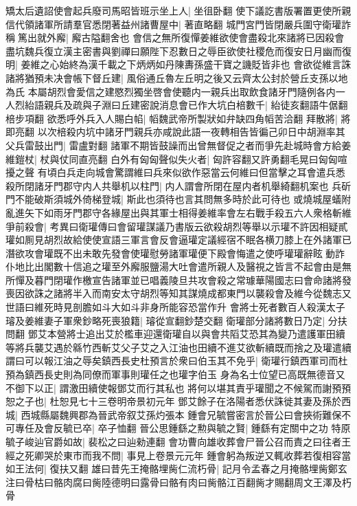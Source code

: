 矯太后遺詔使會起兵廢司馬昭皆班示坐上人|{
	坐徂卧翻}
使下議訖書版署置更使所親信代領諸軍所請羣官悉閉著益州諸曹屋中|{
	著直略翻}
城門宮門皆閉嚴兵圍守衛瓘詐稱篤出就外廨|{
	廨古隘翻舍也}
會信之無所復憚姜維欲使會盡殺北來諸將已因殺會盡坑魏兵復立漢主密書與劉禪曰願陛下忍數日之辱臣欲使社稷危而復安日月幽而復明|{
	姜維之心始終為漢千載之下炳炳如丹陳夀孫盛干寶之譏貶皆非也}
會欲從維言誅諸將猶預未决會帳下督丘建|{
	風俗通丘魯左丘明之後又云齊太公封於營丘支孫以地為氏}
本屬胡烈會愛信之建愍烈獨坐啓會使聽内一親兵出取飲食諸牙門隨例各内一人烈紿語親兵及疏與子淵曰丘建密說消息會已作大坑白棓數千|{
	紿徒亥翻語牛倨翻棓步項翻}
欲悉呼外兵入人賜白㡊|{
	幍魏武帝所製狀如弁缺四角幍苦洽翻}
拜散將|{
	將即亮翻}
以次棓殺内坑中諸牙門親兵亦咸說此語一夜轉相告皆徧己卯日中胡淵率其父兵雷鼓出門|{
	雷盧對翻}
諸軍不期皆鼓譟而出曾無督促之者而爭先赴城時會方給姜維鎧杖|{
	杖與仗同直亮翻}
白外有匈匈聲似失火者|{
	匈許容翻又許勇翻毛晃曰匈匈喧擾之聲}
有頃白兵走向城會驚謂維曰兵來似欲作惡當云何維曰但當擊之耳會遣兵悉殺所閉諸牙門郡守内人共舉机以柱門|{
	内人謂會所閉在屋内者机舉綺翻机案也}
兵斫門不能破斯須城外倚梯登城|{
	斯此也須待也言其問無多時於此可待也}
或燒城屋蟻附亂進矢下如雨牙門郡守各緣屋出與其軍士相得姜維率會左右戰手殺五六人衆格斬維爭前殺會|{
	考異曰衛瓘傳曰會留瓘謀議乃書版云欲殺胡烈等舉以示瓘不許因相疑貳瓘如厠見胡烈故給使使宣語三軍言會反會逼瓘定議經宿不眠各横刀膝上在外諸軍已潛欲攻會瓘既不出未敢先發會使瓘慰勞諸軍瓘便下殿會悔遣之使呼瓘瓘辭眩動詐仆地比出閣數十信追之瓘至外廨服鹽湯大吐會遣所親人及醫視之皆言不起會由是無所憚及暮門閉瓘作檄宣告諸軍並已唱義陵旦共攻會殺之常璩華陽國志曰會命諸將發喪因欲誅之諸將半入而南安太守胡烈等知其謀燒成都東門以襲殺會及維今從魏志又世語曰維死時見剖膽如斗大如斗非身所能容恐當作升}
會將士死者數百人殺漢太子璿及姜維妻子軍衆鈔略死喪狼籍|{
	璿從宣翻鈔楚交翻}
衛瓘部分諸將數日乃定|{
	分扶問翻}
鄧艾本營將士追出艾於檻車迎還衛瓘自以與會共䧟艾恐其為變乃遣護軍田續等將兵襲艾遇於緜竹西斬艾父子艾之入江油也田續不進艾欲斬續既而捨之及瓘遣續謂曰可以報江油之辱矣鎮西長史杜預言於衆曰伯玉其不免乎|{
	衛瓘行鎮西軍司而杜預為鎮西長史則為同僚而軍事則瓘任之也瓘字伯玉}
身為名士位望已高既無德音又不御下以正|{
	謂激田續使報鄧艾而行其私也}
將何以堪其責乎瓘聞之不候駕而謝預預恕之子也|{
	杜恕見七十三卷明帝景初元年}
鄧艾餘子在洛陽者悉伏誅徙其妻及孫於西城|{
	西城縣屬魏興郡為晉武帝叙艾孫灼張本}
鍾會兄毓嘗密言於晉公曰會挾術難保不可專任及會反毓已卒|{
	卒子恤翻}
晉公思鍾繇之勲與毓之賢|{
	鍾繇有定關中之功}
特原毓子峻辿官爵如故|{
	裴松之曰辿勑連翻}
會功曹向雄收葬會尸晉公召而責之曰往者王經之死卿哭於東市而我不問|{
	事見上卷景元元年}
鍾會躬為叛逆又輒收葬若復相容當如王法何|{
	復扶又翻}
雄曰昔先王掩骼埋胔仁流朽骨|{
	記月令孟春之月掩骼埋胔鄭玄注曰骨枯曰骼肉腐曰胔陸德明曰露骨曰骼有肉曰胔骼江百翻胔才賜翻周文王澤及朽骨}

